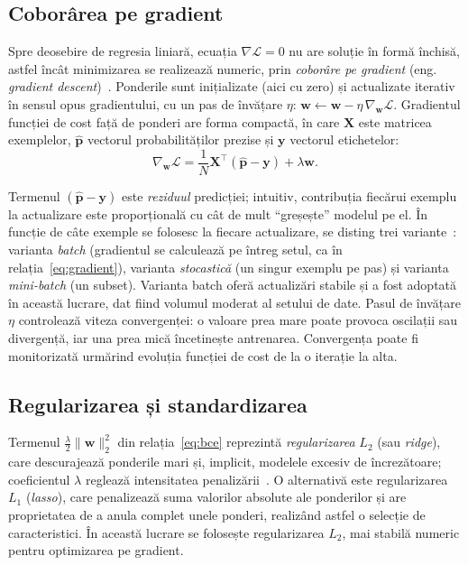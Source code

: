 \documentclass[12pt,a4paper]{report}
\begin{document}
\subsection{Coborârea pe gradient}

Spre deosebire de regresia liniară, ecuația $\nabla \mathcal{L} = 0$ nu are soluție în formă
închisă, astfel încât minimizarea se realizează numeric, prin \emph{coborâre pe gradient} (eng.
\emph{gradient descent})~\cite{boyd2004convex}. Ponderile sunt inițializate (aici cu zero) și
actualizate iterativ în sensul opus gradientului, cu un pas de învățare $\eta$:
$\mathbf{w} \leftarrow \mathbf{w} - \eta \, \nabla_{\mathbf{w}} \mathcal{L}$. Gradientul funcției
de cost față de ponderi are forma compactă, în care $\mathbf{X}$ este matricea exemplelor,
$\hat{\mathbf{p}}$ vectorul probabilităților prezise și $\mathbf{y}$ vectorul etichetelor:
\begin{equation}
  \nabla_{\mathbf{w}} \mathcal{L} = \frac{1}{N} \mathbf{X}^\top (\hat{\mathbf{p}} - \mathbf{y})
  + \lambda \mathbf{w}.
  \label{eq:gradient}
\end{equation}

Termenul $(\hat{\mathbf{p}} - \mathbf{y})$ este \emph{reziduul} predicției; intuitiv,
contribuția fiecărui exemplu la actualizare este proporțională cu cât de mult ``greșește''
modelul pe el. În funcție de câte exemple se folosesc la fiecare actualizare, se disting trei
variante~\cite{hastie2009elements}: varianta \emph{batch} (gradientul se calculează pe întreg
setul, ca în relația~\eqref{eq:gradient}), varianta \emph{stocastică} (un singur exemplu pe pas)
și varianta \emph{mini-batch} (un subset). Varianta batch oferă actualizări stabile și a fost
adoptată în această lucrare, dat fiind volumul moderat al setului de date. Pasul de învățare
$\eta$ controlează viteza convergenței: o valoare prea mare poate provoca oscilații sau
divergență, iar una prea mică încetinește antrenarea. Convergența poate fi monitorizată urmărind
evoluția funcției de cost de la o iterație la alta.

\subsection{Regularizarea și standardizarea}

Termenul $\tfrac{\lambda}{2} \lVert \mathbf{w} \rVert_2^2$ din relația~\eqref{eq:bce} reprezintă
\emph{regularizarea} $L_2$ (sau \emph{ridge}), care descurajează ponderile mari și, implicit,
modelele excesiv de încrezătoare; coeficientul $\lambda$ reglează intensitatea
penalizării~\cite{hastie2009elements}. O alternativă este regularizarea $L_1$ (\emph{lasso}),
care penalizează suma valorilor absolute ale ponderilor și are proprietatea de a anula complet
unele ponderi, realizând astfel o selecție de caracteristici. În această lucrare se folosește
regularizarea $L_2$, mai stabilă numeric pentru optimizarea pe gradient.
\end{document}
